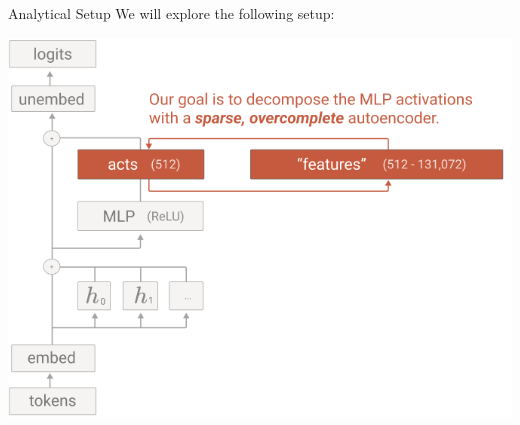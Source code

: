 \documentclass{beamer}
\begin{document}
\begin{frame}{Analytical Setup}
	We will explore the following setup:
	\begin{center}
		\includegraphics[width=.6\textwidth]{img/mono-arch.png}
	\end{center}
\end{frame}
\end{document}
